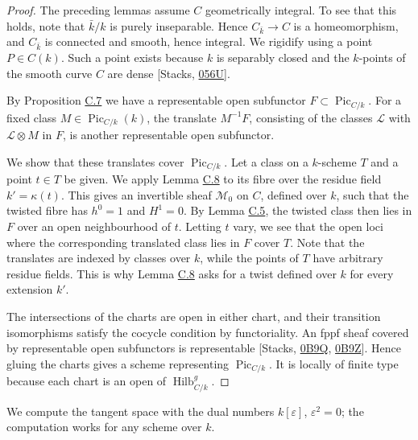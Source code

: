 \documentclass[11pt]{article}
\begin{document}
\begin{proof}[{Proof}]\label{bp150}%
The preceding lemmas assume \(C\) geometrically integral. To see that this holds, note that \(\bar k/k\) is purely inseparable. Hence \(C_{\bar k}\to C\) is a homeomorphism, and \(C_{\bar k}\) is connected and smooth, hence integral. We rigidify using a point \(P\in C(k)\). Such a point exists because \(k\) is separably closed and the \(k\)-points of the smooth curve \(C\) are dense [Stacks, \href{https://stacks.math.columbia.edu/tag/056U}{056U}].

By Proposition \hyperref[bp142]{C.7} we have a representable open subfunctor \(F\subset\operatorname{Pic}_{C/k}\). For a fixed class \(M\in\operatorname{Pic}_{C/k}(k)\), the translate \(M^{-1}F\), consisting of the classes \(\mathcal L\) with \(\mathcal L\otimes M\) in \(F\), is another representable open subfunctor.

We show that these translates cover \(\operatorname{Pic}_{C/k}\). Let a class on a \(k\)-scheme \(T\) and a point \(t\in T\) be given. We apply Lemma \hyperref[bp145]{C.8} to its fibre over the residue field \(k'=\kappa(t)\). This gives an invertible sheaf \(\mathcal M_0\) on \(C\), defined over \(k\), such that the twisted fibre has \(h^0=1\) and \(H^1=0\). By Lemma \hyperref[bp135]{C.5}, the twisted class then lies in \(F\) over an open neighbourhood of \(t\). Letting \(t\) vary, we see that the open loci where the corresponding translated class lies in \(F\) cover \(T\). Note that the translates are indexed by classes over \(k\), while the points of \(T\) have arbitrary residue fields. This is why Lemma \hyperref[bp145]{C.8} asks for a twist defined over \(k\) for every extension \(k'\).

The intersections of the charts are open in either chart, and their transition isomorphisms satisfy the cocycle condition by functoriality. An fppf sheaf covered by representable open subfunctors is representable [Stacks, \href{https://stacks.math.columbia.edu/tag/0B9Q}{0B9Q}, \href{https://stacks.math.columbia.edu/tag/0B9Z}{0B9Z}]. Hence gluing the charts gives a scheme representing \(\operatorname{Pic}_{C/k}\). It is locally of finite type because each chart is an open of \(\operatorname{Hilb}^{g}_{C/k}\).
\end{proof}

\label{bp151}%
We compute the tangent space with the dual numbers \(k[\varepsilon]\), \(\varepsilon^2=0\); the computation works for any scheme over \(k\).
\end{document}
